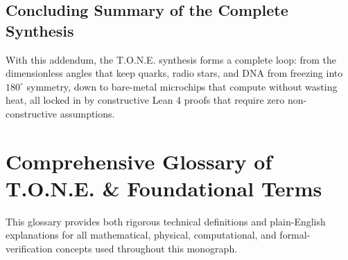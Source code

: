 \documentclass[11pt,a4paper,oneside]{article}
\theoremstyle{definition}
\begin{document}
\subsection{Concluding Summary of the Complete Synthesis}
\begin{noobbox}
With this addendum, the T.O.N.E. synthesis forms a complete loop: from the dimensionless angles that keep quarks, radio stars, and DNA from freezing into $180^\circ$ symmetry, down to bare-metal microchips that compute without wasting heat, all locked in by constructive Lean 4 proofs that require zero non-constructive assumptions.
\end{noobbox}

\newpage
\section{Comprehensive Glossary of T.O.N.E. \& Foundational Terms}

This glossary provides both rigorous technical definitions and plain-English explanations for all mathematical, physical, computational, and formal-verification concepts used throughout this monograph.
\end{document}
